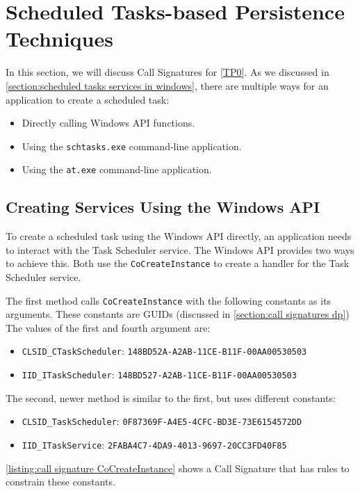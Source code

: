 \section{Scheduled Tasks-based Persistence Techniques}\label{section:call signatures tp}
In this section, we will discuss Call Signatures for \autoref{TP0}. As we discussed in \autoref{section:scheduled tasks services in windows}, there are multiple ways for an application to create a scheduled task:

\begin{itemize}
    \item Directly calling Windows API functions.
    \item Using the \texttt{schtasks.exe} command-line application.
    \item Using the \texttt{at.exe} command-line application.
\end{itemize}

\subsection{Creating Services Using the Windows API}
To create a scheduled task using the Windows API directly, an application needs to interact with the Task Scheduler service. The Windows API provides two ways to achieve this. Both use the \texttt{CoCreateInstance} to create a handler for the Task Scheduler service.

The first method calls \texttt{CoCreateInstance} with the following constants as its arguments. These constants are GUIDs (discussed in \autoref{section:call signatures dp}) The values of the first and fourth argument are:
\begin{itemize}
  \item \texttt{CLSID\_CTaskScheduler}: \texttt{148BD52A-A2AB-11CE-B11F-00AA00530503}
  \item \texttt{IID\_ITaskScheduler}: \texttt{148BD527-A2AB-11CE-B11F-00AA00530503}
\end{itemize}

The second, newer method is similar to the first, but uses different constants:
\begin{itemize}
  \item \texttt{CLSID\_TaskScheduler}: \texttt{0F87369F-A4E5-4CFC-BD3E-73E6154572DD}
  \item \texttt{IID\_ITaskService}: \texttt{2FABA4C7-4DA9-4013-9697-20CC3FD40F85}
\end{itemize}

\autoref{listing:call signature CoCreateInstance} shows a Call Signature that has rules to constrain these constants.

